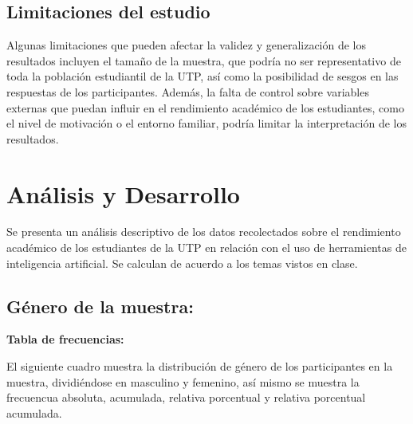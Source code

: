 \documentclass{article}
\newenvironment{metodologia}{}{}
\newenvironment{analisisDescriptivo}{}{}
\begin{document}
\begin{metodologia}
  \subsection{Limitaciones del estudio}

  Algunas limitaciones que pueden afectar la validez y generalización de los resultados incluyen el tamaño de la muestra, que podría no ser representativo de toda la población estudiantil de la UTP, así como la posibilidad de sesgos en las respuestas de los participantes. Además, la falta de control sobre variables externas que puedan influir en el rendimiento académico de los estudiantes, como el nivel de motivación o el entorno familiar, podría limitar la interpretación de los resultados.
\end{metodologia}

\newpage

\begin{analisisDescriptivo}

  \section{Análisis y Desarrollo}
  \vspace{-0.5cm}
  Se presenta un análisis descriptivo de los datos recolectados sobre el rendimiento académico de los estudiantes de la UTP en relación con el uso de herramientas de inteligencia artificial. Se calculan de acuerdo a los temas vistos en clase.
  
\end{analisisDescriptivo}

\vspace{-0.5cm}
\subsection{Género de la muestra:}
  
  \textbf{Tabla de frecuencias:}
  
  El siguiente cuadro muestra la distribución de género de los participantes en la muestra, dividiéndose en masculino y femenino, así mismo se muestra la frecuencua absoluta, acumulada, relativa porcentual y relativa porcentual acumulada.
\end{document}
